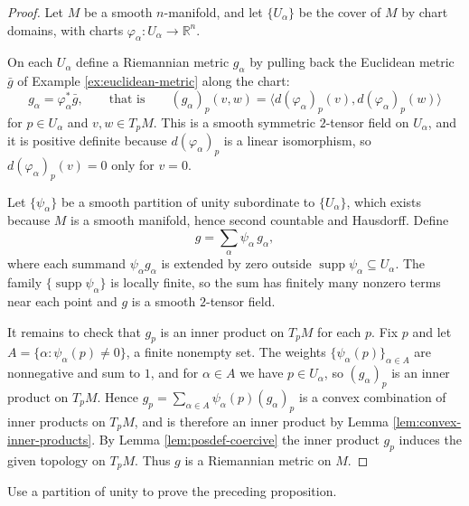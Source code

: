 \begin{proof}
\leanok
{}
Let $M$ be a smooth $n$-manifold, and let $\{U_\alpha\}$ be the cover of $M$ by chart domains, with charts $\varphi_\alpha : U_\alpha \to \mathbb{R}^n$.

On each $U_\alpha$ define a Riemannian metric $g_\alpha$ by pulling back the Euclidean metric $\bar{g}$ of Example \ref{ex:euclidean-metric} along the chart:
\[
g_\alpha = \varphi_\alpha^* \bar{g}, \qquad\text{that is}\qquad
(g_\alpha)_p(v,w) = \langle d(\varphi_\alpha)_p (v), d(\varphi_\alpha)_p (w)\rangle
\]
for $p \in U_\alpha$ and $v, w \in T_p M$. This is a smooth symmetric $2$-tensor field on $U_\alpha$, and it is positive definite because $d(\varphi_\alpha)_p$ is a linear isomorphism, so $d(\varphi_\alpha)_p(v) = 0$ only for $v = 0$.

Let $\{\psi_\alpha\}$ be a smooth partition of unity subordinate to $\{U_\alpha\}$, which exists because $M$ is a smooth manifold, hence second countable and Hausdorff. Define
\[
g = \sum_\alpha \psi_\alpha \, g_\alpha ,
\]
where each summand $\psi_\alpha g_\alpha$ is extended by zero outside $\operatorname{supp}\psi_\alpha \subseteq U_\alpha$. The family $\{\operatorname{supp}\psi_\alpha\}$ is locally finite, so the sum has finitely many nonzero terms near each point and $g$ is a smooth $2$-tensor field.

It remains to check that $g_p$ is an inner product on $T_p M$ for each $p$. Fix $p$ and let $A = \{\alpha : \psi_\alpha(p) \neq 0\}$, a finite nonempty set. The weights $\{\psi_\alpha(p)\}_{\alpha \in A}$ are nonnegative and sum to $1$, and for $\alpha \in A$ we have $p \in U_\alpha$, so $(g_\alpha)_p$ is an inner product on $T_p M$. Hence $g_p = \sum_{\alpha \in A} \psi_\alpha(p) (g_\alpha)_p$ is a convex combination of inner products on $T_p M$, and is therefore an inner product by Lemma \ref{lem:convex-inner-products}. By Lemma \ref{lem:posdef-coercive} the inner product $g_p$ induces the given topology on $T_p M$. Thus $g$ is a Riemannian metric on $M$.
\end{proof}

\begin{exercise}
\label{exer:partition-unity-proof}
\leanok
{}
Use a partition of unity to prove the preceding proposition.
\end{exercise}

